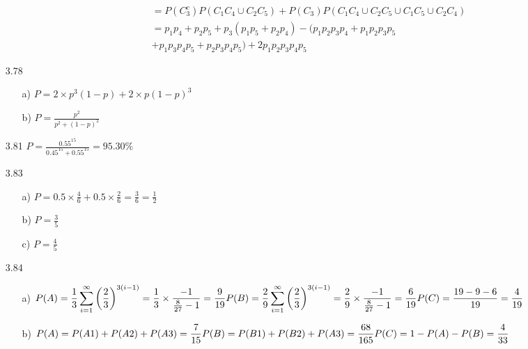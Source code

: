 \documentclass{article}
\begin{document}
\begin{itemize}
\begin{itemize}
\begin{align*}
&= P(C_3^c)P(C_1C_4 \cup C_2C_5) + P(C_3)P(C_1C_4 \cup C_2C_5 \cup C_1C_5 \cup C_2C_4)\\
&=p_1p_4 + p_2p_5 + p_3(p_1p_5 + p_2p_4) - (p_1p_2p_3p_4 + p_1p_2p_3p_5 \\&+ p_1p_3p_4p_5 + p_2p_3p_4p_5) + 2p_1p_2p_3p_4p_5
                \end{align*}
    \end{itemize}
    \item [3.78]
    \begin{itemize}
        \item [a)] \(P = 2\times p^3(1-p)+2\times p(1-p)^3\)
        \item [b)] \(P = \frac{p^2}{p^2+(1-p)^2}\)
    \end{itemize}
    \item [3.81]\(\displaystyle
    P = \frac{0.55^{15}}{0.45^{15}+0.55^{15}} = 95.30\%
    \)
    \item [3.83]\begin{itemize}
        \item [a)]\(P = 0.5\times \frac{4}{6}+0.5\times\frac{2}{6}=\frac{3}{6}=\frac{1}{2}\)
        \item [b)]\(P = \frac{3}{5}\)
        \item [c)]\(P = \frac{4}{5}\)
    \end{itemize}
    \item [3.84]
    \begin{itemize}
        \item [a)]\(\displaystyle P(A) = \frac{1}{3}\sum_{i=1}^{\infty} \left(\frac{2}{3}\right)^{3(i-1)} = \frac{1}{3}\times\frac{-1}{\frac{8}{27}-1}=\frac{9}{19} \\
        P(B) = \frac{2}{9}\sum_{i=1}^{\infty} \left(\frac{2}{3}\right)^{3(i-1)} = \frac{2}{9}\times\frac{-1}{\frac{8}{27}-1}=\frac{6}{19}\\
        P(C) = \frac{19-9-6}{19} = \frac{4}{19} 
        \)
        
        \item [b)]\(\displaystyle
        P(A) =  P(A1)+P(A2)+P(A3) = \frac{7}{15}\\
        P(B) =  P(B1)+P(B2)+P(A3) = \frac{68}{165}\\
        P(C) =  1-P(A)-P(B)= \frac{4}{33}
        \)
\end{itemize}
\end{itemize}
\end{document}
